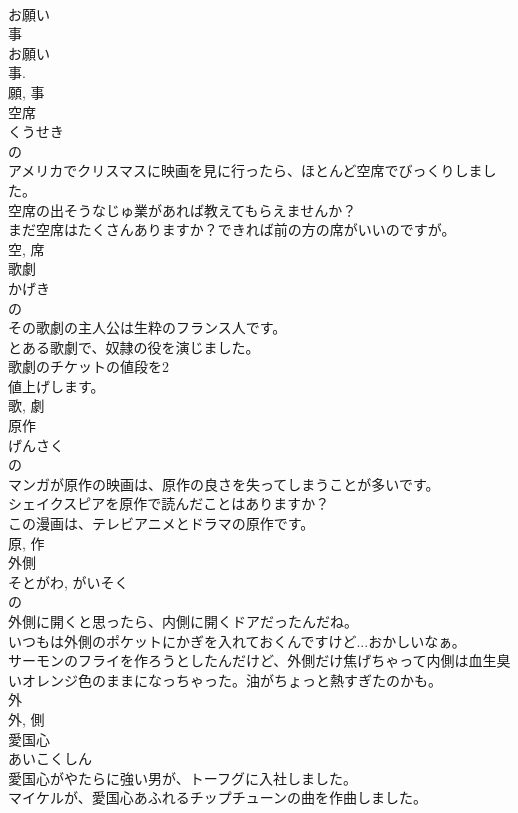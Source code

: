 \documentclass[8pt]{extreport}
\begin{document}
\begin{CJK}{UTF8}{min}
\\	お願い 
\\	事 
\\	お願い 
\\	事. 
\\	願, 事	
\\	空席	
\\	くうせき	
\\	の 
\\	アメリカでクリスマスに映画を見に行ったら、ほとんど空席でびっくりしました。	
\\	空席の出そうなじゅ業があれば教えてもらえませんか？	
\\	まだ空席はたくさんありますか？できれば前の方の席がいいのですが。	
\\	空, 席	
\\	歌劇	
\\	かげき	
\\	の 
\\	その歌劇の主人公は生粋のフランス人です。	
\\	とある歌劇で、奴隷の役を演じました。	
\\	歌劇のチケットの値段を2
\\	値上げします。	
\\	歌, 劇	
\\	原作	
\\	げんさく	
\\	の 
\\	マンガが原作の映画は、原作の良さを失ってしまうことが多いです。	
\\	シェイクスピアを原作で読んだことはありますか？	
\\	この漫画は、テレビアニメとドラマの原作です。	
\\	原, 作	
\\	外側	
\\	そとがわ, がいそく	
\\	の 
\\	外側に開くと思ったら、内側に開くドアだったんだね。	
\\	いつもは外側のポケットにかぎを入れておくんですけど...おかしいなぁ。	
\\	サーモンのフライを作ろうとしたんだけど、外側だけ焦げちゃって内側は血生臭いオレンジ色のままになっちゃった。油がちょっと熱すぎたのかも。	
\\	外 
\\	外, 側	
\\	愛国心	
\\	あいこくしん	
\\	愛国心がやたらに強い男が、トーフグに入社しました。	
\\	マイケルが、愛国心あふれるチップチューンの曲を作曲しました。	

\end{CJK}
\end{document}
